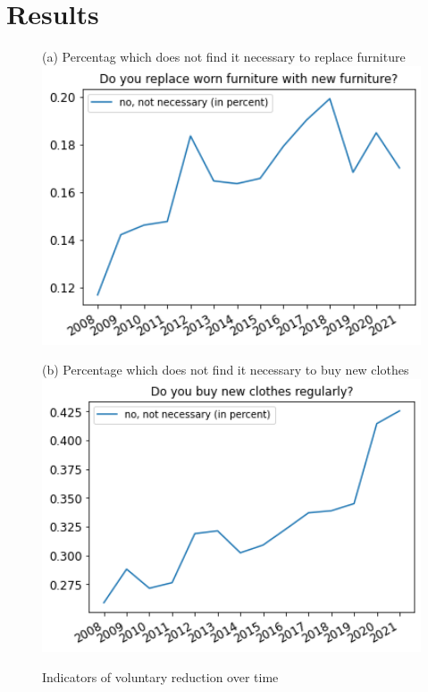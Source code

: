 \documentclass[12pt]{article}
\begin{document}
\section{Results}

\begin{figure}[h!!]
	\centering	
	\caption{Indicators of voluntary reduction over time}\label{fig:evolution_notNecessary}	
	\begin{minipage}[h!!]{0.4\textwidth}  
		\centering\footnotesize{(a) Percentag which does not find it necessary to replace furniture}
		\includegraphics[width=1\textwidth]{../codding_data/results/liss/total_share_notnecessary_ci307.png}
	\end{minipage}
	\begin{minipage}[h!!]{0.4\textwidth}
		\centering\footnotesize{(b) Percentage which does not find it necessary to buy new clothes}
		\includegraphics[width=1\textwidth]{../codding_data/results/liss/total_share_notnecessary_ci306.png}

\end{minipage}
\end{figure}
\end{document}
